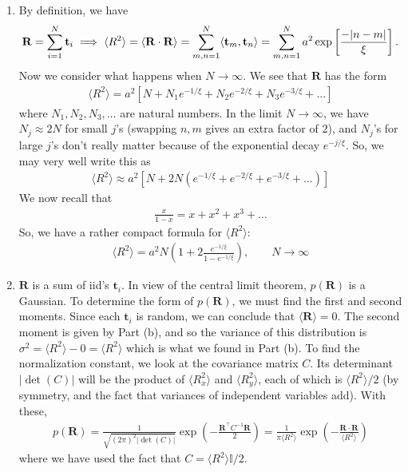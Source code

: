 \documentclass{article}
\theoremstyle{definition}
\newcommand{\f}[2]{\frac{#1}{#2}}
\newcommand{\lp}{\left(}
\newcommand{\rp}{\right)}
\newcommand{\lb}{\left[}
\newcommand{\rb}{\right]}
\begin{document}
\begin{enumerate}[label=(\alph*)]
	
	
	\item By definition, we have
	\begin{align*}
	\mathbf{R} = \sum_{i=1}^N \mathbf{t}_i \implies \langle R^2 \rangle = \langle \mathbf{R}\cdot \mathbf{R} \rangle = \sum_{m,n=1}^{N} \langle \mathbf{t}_m, \mathbf{t}_n \rangle 
	= \sum_{m,n=1}^{N} a^2 \exp\lb \f{-\abs{n-m}}{\xi} \rb.
	\end{align*}
	Now we consider what happens when $N\to \infty$. We see that $\mathbf{R}$ has the form 
	\begin{align*}
	\langle R^2 \rangle = a^2 \lb N  + N_1e^{-1/\xi} + N_2 e^{-2/\xi} + N_3 e^{-3/\xi} + \dots  \rb 
	\end{align*}   
	where $N_1,N_2,N_3,\dots$ are natural numbers. In the limit $N\to \infty$, we have $N_j\approx 2N$ for small $j$'s (swapping $n,m$ gives an extra factor of $2$), and $N_j$'s for large $j$'s don't really matter because of the exponential decay $e^{-j/\xi}$. So, we may very well write this as 
	\begin{align*}
	\langle R^2 \rangle \approx a^2 \lb N + 2N \lp e^{-1/\xi} + e^{-2/\xi} + e^{-3/\xi} + \dots \rp \rb 
	\end{align*}
	We now recall that 
	\begin{align*}
	\f{x}{1-x} = x+x^2+x^3 + \dots
	\end{align*}
	So, we have a rather compact formula for $\langle R^2 \rangle$:
	\begin{align*}
	\boxed{\langle R^2 \rangle = a^2 N \lp 1 + 2\f{e^{-1/\xi}}{1-e^{-1/\xi}} \rp,\quad\quad N\to \infty }
	\end{align*}
	
	
	\item $\mathbf{R}$ is a sum of iid's $\mathbf{t}_i$. In view of the central limit theorem, $p(\mathbf{R})$ is a Gaussian. To determine the form of $p(\mathbf{R})$, we must find the first and second moments. Since each $\mathbf{t}_i$ is  random, we can conclude that $\langle \mathbf{R} \rangle = 0$. The second moment is given by Part (b), and so the variance of this distribution is $\sigma^2 = \langle R^2 \rangle - 0 = \langle R^2 \rangle $ which is what we found in Part (b). To find the normalization constant, we look at the covariance matrix $C$. Its determinant $|\det(C)|$ will be the product of $\langle R_x^2\rangle$ and $\langle R_y^2 \rangle$, each of which is $\langle R^2 \rangle /2$ (by symmetry, and the fact that variances of independent variables add). With these, 
	\begin{align*}
	p(\mathbf{R}) = \f{1}{\sqrt{(2\pi)^2 |\det(C)|}} \exp \lp -\f{\mathbf{R}^\top C^{-1} \mathbf{R}}{ 2} \rp = \boxed{\f{1}{\pi \langle R^2 \rangle} \exp\lp -\f{\mathbf{R}\cdot \mathbf{R}}{\langle R^2 \rangle} \rp}
	\end{align*}
	where we have used the fact that $C = \langle R^2 \rangle\mathbb{I}/2$. 
	

\end{enumerate}
\end{document}
